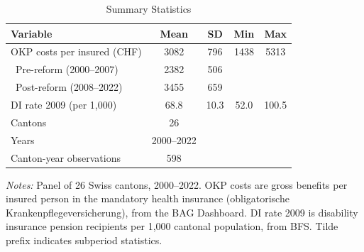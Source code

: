 \begin{table}[H]
\centering
\caption{Summary Statistics}
\begin{threeparttable}
\begin{tabular}{lcccc}
\toprule
Variable & Mean & SD & Min & Max \\
\midrule
OKP costs per insured (CHF) & 3082 & 796 & 1438 & 5313 \\
~Pre-reform (2000--2007) & 2382 & 506 &  &  \\
~Post-reform (2008--2022) & 3455 & 659 &  &  \\
DI rate 2009 (per 1,000) & 68.8 & 10.3 & 52.0 & 100.5 \\
Cantons & 26 &  &  &  \\
Years & 2000--2022 &  &  &  \\
Canton-year observations & 598 &  &  &  \\
\bottomrule
\end{tabular}
\begin{tablenotes}[flushleft]
\small
\item \textit{Notes:} Panel of 26 Swiss cantons, 2000--2022. OKP costs are gross benefits per insured person in the mandatory health insurance (obligatorische Krankenpflegeversicherung), from the BAG Dashboard. DI rate 2009 is disability insurance pension recipients per 1,000 cantonal population, from BFS. Tilde prefix indicates subperiod statistics.
\end{tablenotes}
\end{threeparttable}
\label{tab:summary}
\end{table}


